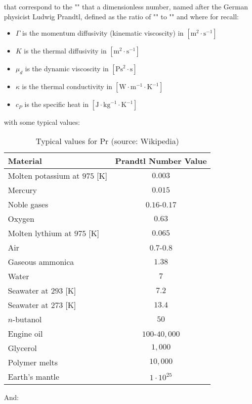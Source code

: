 	that correspond to the "" that a dimensionless number, named after the German physicist Ludwig Prandtl, defined as the ratio of "" to "" and where for recall:
	\begin{itemize}
		\item $\Gamma$ is the momentum diffusivity (kinematic viscoscity) in $[\text{m}^2\cdot \text{s}^{-1}]$
		\item $K$ is the thermal diffusivity in $[\text{m}^2\cdot \text{s}^{-1}]$
		\item $\mu_d$ is the dynamic viscoscity in $[\text{Ps}^2\cdot \text{s}]$
		\item $\kappa$ is the thermal conductivity in $[\text{W}\cdot \text{m}^{-1}\cdot\text{K}^{-1}]$
		\item $c_P$ is the specific heat in $[\text{J}\cdot\text{kg}^{-1}\cdot\text{K}^{-1}]$
	\end{itemize}
	with some typical values:
	\begin{table}[H]
		\begin{center}
		\begin{tabular}{|l|c|}
			\hline
			{\cellcolor{black!30}Material} & {\cellcolor{black!30}Prandtl Number Value}  \\ \hline
			Molten potassium at $975$ [K] & $0.003$\\ \hline
			Mercury & $0.015$\\ \hline
			Noble gases & $0.16$-$0.17$ \\ \hline
			Oxygen & $0.63$ \\ \hline
			Molten lythium at $975$ [K] & $0.065$\\ \hline
			Air & $0.7$-$0.8$\\ \hline
			Gaseous ammonica & $1.38$\\ \hline
			Water & $7$\\ \hline
			Seawater at $293$ [K] & $7.2$\\ \hline
			Seawater at $273$ [K] & $13.4$\\ \hline
			$n$-butanol & $50$\\ \hline
			Engine oil & $100$-$40,000$\\ \hline
			Glycerol & $1,000$\\ \hline
			Polymer melts & $10,000$\\ \hline
			Earth's mantle & $1\cdot 10^{25}$\\ \hline
		\end{tabular}
		\end{center}
		\caption[Typical values for Pr]{Typical values for Pr (source: Wikipedia)}
	\end{table}
	And:
	
